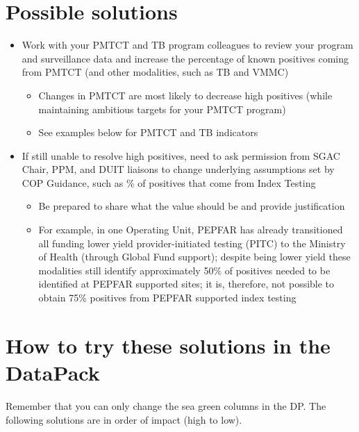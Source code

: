 \documentclass[
  openany]{book}
\providecommand{\tightlist}{%
  \setlength{\itemsep}{0pt}\setlength{\parskip}{0pt}}
\begin{document}
\hypertarget{possible-solutions}{%
\section{Possible solutions}\label{possible-solutions}}

\begin{itemize}
\item
  Work with your PMTCT and TB program colleagues to review your program and surveillance data and increase the percentage of known positives coming from PMTCT (and other modalities, such as TB and VMMC)

  \begin{itemize}
  \tightlist
  \item
    Changes in PMTCT are most likely to decrease high positives (while maintaining ambitious targets for your PMTCT program)
  \item
    See examples below for PMTCT and TB indicators
  \end{itemize}
\item
  If still unable to resolve high positives, need to ask permission from SGAC Chair, PPM, and DUIT liaisons to change underlying assumptions set by COP Guidance, such as \% of positives that come from Index Testing

  \begin{itemize}
  \tightlist
  \item
    Be prepared to share what the value should be and provide justification
  \item
    For example, in one Operating Unit, PEPFAR has already transitioned all funding lower yield provider-initiated testing (PITC) to the Ministry of Health (through Global Fund support); despite being lower yield these modalities still identify approximately 50\% of positives needed to be identified at PEPFAR supported sites; it is, therefore, not possible to obtain 75\% positives from PEPFAR supported index testing
  \end{itemize}
\end{itemize}

\hypertarget{how-to-try-these-solutions-in-the-datapack}{%
\section{How to try these solutions in the DataPack}\label{how-to-try-these-solutions-in-the-datapack}}

Remember that you can only change the sea green columns in the DP. The following solutions are in order of impact (high to low).
\end{document}
